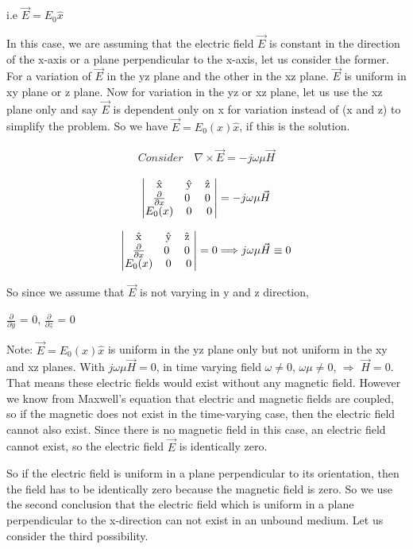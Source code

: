 i.e $\vec{E}={E_{0}}\hat{x}$

In this case, we are assuming that the electric field $\vec{E}$ is constant in the direction of the x-axis or a plane perpendicular to the x-axis, let us consider the former. For a variation of $\vec{E}$ in the yz plane and the other in the xz plane. $\vec{E}$ is uniform in xy plane or z plane. Now for variation in the yz or xz plane, let us use the xz plane only and say $\vec{E}$ is dependent only on x for variation instead of (x and z) to simplify the problem. So we have $\vec{E}={E_{0}(x)}\hat{x}$, if this is the solution.

\begin{align}
Consider\quad\nabla\times\vec{E}=-j\omega\mu\vec{H}
\end{align}


\[
\begin{vmatrix}
$\^{x}$ & $\^{y}$ & $\^{z} $\\
$$\frac{\partial}{\partial x}$$ & $0 $ & $0 $\\
$$E_{0}(x)$$ & 0 & 0
\end{vmatrix} =
-j\omega \mu \vec{H}
\]




\[
\begin{vmatrix}
$\^{x}$ & $\^{y}$ & $\^{z} $ \\
$$\frac{\partial}{\partial x}$$ & $0 $ & $0 $ \\
$$E_{0}(x)$$ & 0 & 0
\end{vmatrix} =0 \Longrightarrow j\omega\mu\vec{H}\equiv0
\]

So since we assume that $\vec{E}$ is not varying in y and z direction,

$\frac{\partial}{\partial y}$ = 0,
$\frac{\partial}{\partial z}$ = 0

Note: $\vec{E}={E_{0}(x)\hat{x}}$ is uniform in the yz plane only but not uniform in the xy and xz planes. With $j\omega\mu\vec{H}=0$, in time varying field $\omega\neq0$, $\omega\mu\neq0$, $\Longrightarrow$ $\vec{H}=0$. That means these electric fields would exist without any magnetic field. However we know from Maxwell's equation that electric and magnetic fields are coupled, so if the magnetic does not exist in the time-varying case, then the electric field cannot also exist. Since there is no magnetic field in this case, an electric field cannot exist, so the electric field $\vec{E}$ is identically zero.

So if the electric field is uniform in a plane perpendicular to its orientation, then the field has to be identically zero because the magnetic field is zero. So we use the second conclusion that the electric field which is uniform in a plane perpendicular to the x-direction can not exist in an unbound medium. Let us consider the third possibility.

